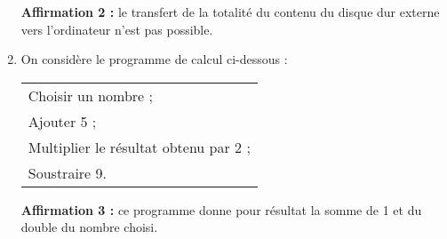 \begin{enumerate}
\smallskip

\textbf{Affirmation 2 :} le transfert de la totalité du contenu du disque dur externe vers l'ordinateur n'est pas possible.
\item On considère le programme de calcul ci-dessous :

\begin{center} 
\begin{tabularx}{0.5\linewidth}{|X|}\hline
Choisir un nombre ; \\
Ajouter 5 ;\\ 

Multiplier le résultat obtenu par 2 ;\\

Soustraire 9.\\ \hline
\end{tabularx}
\end{center} 

\textbf{Affirmation 3 :} ce programme donne pour résultat la somme de 1 et du double du nombre choisi. 
\end{enumerate} 

\vspace{0.5pt}

